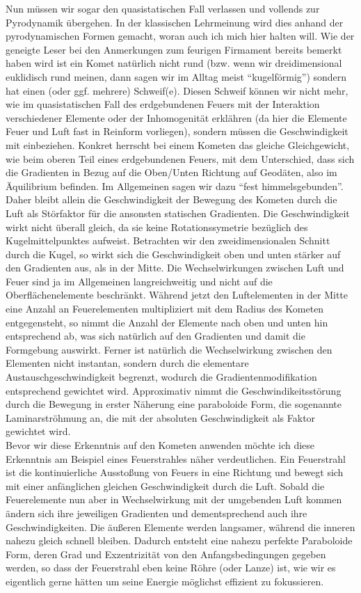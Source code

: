 \documentclass[a5paper,8pt]{book}
\begin{document}
Nun müssen wir sogar den quasistatischen Fall verlassen und vollends zur Pyrodynamik übergehen. In der klassischen 
Lehrmeinung wird dies anhand der pyrodynamischen Formen gemacht, woran auch ich mich hier halten will.
Wie der geneigte Leser bei den Anmerkungen zum feurigen Firmament bereits bemerkt haben wird ist ein Komet natürlich nicht 
rund (bzw. wenn wir dreidimensional euklidisch rund meinen, dann sagen wir im Alltag meist “kugelförmig”) sondern hat einen 
(oder ggf. mehrere) Schweif(e). Diesen Schweif können wir nicht mehr, wie im quasistatischen Fall des erdgebundenen Feuers mit 
der Interaktion verschiedener Elemente oder der Inhomogenität erklähren (da hier die Elemente Feuer und Luft fast in 
Reinform vorliegen), sondern müssen die Geschwindigkeit mit einbeziehen.
Konkret herrscht bei einem Kometen das gleiche Gleichgewicht, wie beim oberen Teil eines erdgebundenen Feuers, mit dem 
Unterschied, dass sich die Gradienten in Bezug auf die Oben/Unten Richtung auf Geodäten, also im Äquilibrium befinden. Im 
Allgemeinen sagen wir dazu “fest himmelsgebunden”.
Daher bleibt allein die Geschwindigkeit der Bewegung des Kometen durch die Luft als Störfaktor für die ansonsten statischen
Gradienten. Die Geschwindigkeit wirkt nicht überall gleich, da sie keine Rotationssymetrie bezüglich des Kugelmittelpunktes 
aufweist. Betrachten wir den zweidimensionalen Schnitt durch die Kugel, so wirkt sich die Geschwindigkeit oben und unten 
stärker auf den Gradienten aus, als in der Mitte. Die Wechselwirkungen zwischen Luft und Feuer sind ja im Allgemeinen 
langreichweitig und nicht auf die Oberflächenelemente beschränkt. Während jetzt den Luftelementen in der Mitte eine Anzahl 
an Feuerelementen multipliziert mit dem Radius des Kometen entgegensteht, so nimmt die Anzahl der Elemente nach oben und 
unten hin entsprechend ab, was sich natürlich auf den Gradienten und damit die Formgebung auswirkt. Ferner ist natürlich 
die Wechselwirkung zwischen den Elementen nicht instantan, sondern durch die elementare Austauschgeschwindigkeit begrenzt, 
wodurch die Gradientenmodifikation entsprechend 
gewichtet wird.
Approximativ nimmt die Geschwindikeitsstörung durch die Bewegung in erster Näherung eine paraboloide Form, die sogenannte 
Laminarströhmung an, die mit der absoluten Geschwindigkeit als Faktor gewichtet wird.\\

Bevor wir diese Erkenntnis auf den Kometen anwenden möchte ich diese Erkenntnis am Beispiel eines Feuerstrahles näher 
verdeutlichen. Ein Feuerstrahl ist die kontinuierliche Ausstoßung von Feuers in eine Richtung und bewegt sich mit einer 
anfänglichen gleichen Geschwindigkeit durch die Luft. Sobald die Feuerelemente nun aber in Wechselwirkung mit der umgebenden
Luft kommen ändern sich ihre jeweiligen Gradienten und dementsprechend auch ihre Geschwindigkeiten. Die äußeren Elemente 
werden langsamer, während die inneren nahezu gleich schnell bleiben. Dadurch entsteht eine nahezu perfekte Paraboloide 
Form, deren Grad und Exzentrizität von den Anfangsbedingungen gegeben werden, so dass der Feuerstrahl eben keine Röhre 
(oder Lanze) ist, wie wir es eigentlich gerne hätten um seine Energie möglichst effizient zu fokussieren.\\
\end{document}

